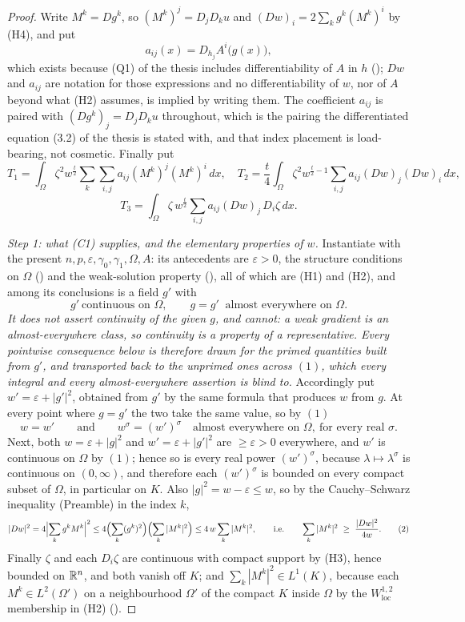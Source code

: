 \begin{proof}
Write $M^k=Dg^k$, so $(M^k)^j=D_jD_ku$ and $(Dw)_i=2\sum_kg^k(M^k)^i$ by (H4),
and put
\[
a_{ij}(x)=D_{h_j}A^i\bigl(g(x)\bigr),
\]
which exists because (Q1) of the thesis includes differentiability of $A$ in $h$
(); $Dw$ and $a_{ij}$ are notation for those
expressions and no differentiability of $w$, nor of $A$ beyond what (H2)
assumes, is implied by writing them.  The coefficient $a_{ij}$ is paired with
$(Dg^k)_j=D_jD_ku$ throughout, which is the pairing the differentiated equation
(3.2) of the thesis is stated with, and that index placement is load-bearing, not
cosmetic.  Finally put
\[
T_1=\int_\Omega\zeta^2w^{\frac t2}\sum_k\sum_{i,j}a_{ij}(M^k)^j(M^k)^i\,dx,
\quad
T_2=\frac t4\int_\Omega\zeta^2w^{\frac t2-1}\sum_{i,j}a_{ij}(Dw)_j(Dw)_i\,dx,
\]
\[
T_3=\int_\Omega\zeta\,w^{\frac t2}\sum_{i,j}a_{ij}(Dw)_j\,D_i\zeta\,dx .
\]

\emph{Step 1: what (C1) supplies, and the elementary properties of $w$.}
Instantiate  with the present
$n,p,\varepsilon,\gamma_0,\gamma_1,\Omega,A$: its antecedents are
$\varepsilon>0$, the structure conditions on $\Omega$
() and the weak-solution property
(), all of which are (H1) and (H2), and among its
conclusions is a field $g'$ with
\[
g'\ \text{continuous on }\Omega,
\qquad
g=g'\ \text{ almost everywhere on }\Omega .
\tag{1}
\]
\emph{It does not assert continuity of the given $g$, and cannot: a weak
gradient is an almost-everywhere class, so continuity is a property of a
representative.  Every \emph{pointwise} consequence below is therefore drawn for
the primed quantities built from $g'$, and transported back to the unprimed ones
across $(1)$, which every integral and every almost-everywhere assertion is
blind to.}  Accordingly put $w'=\varepsilon+|g'|^2$, obtained from $g'$ by the
same formula that produces $w$ from $g$.  At every point where $g=g'$ the two
take the same value, so by $(1)$
\[
w=w'\qquad\text{and}\qquad w^\sigma=(w')^\sigma
\quad\text{almost everywhere on }\Omega,\ \text{for every real }\sigma .
\tag{1$'$}
\]
Next, both $w=\varepsilon+|g|^2$ and $w'=\varepsilon+|g'|^2$ are
$\ge\varepsilon>0$ everywhere, and $w'$ is continuous on $\Omega$ by $(1)$;
hence so is every real power $(w')^\sigma$, because
$\lambda\mapsto\lambda^\sigma$ is continuous on $(0,\infty)$, and therefore each
$(w')^\sigma$ is bounded on every compact subset of $\Omega$, in particular on
$K$.  Also $|g|^2=w-\varepsilon\le w$, so by the Cauchy--Schwarz inequality
(Preamble) in the index $k$,
\[
|Dw|^2=4\Bigl|\sum_kg^kM^k\Bigr|^2
\le4\Bigl(\sum_k(g^k)^2\Bigr)\Bigl(\sum_k|M^k|^2\Bigr)
\le4\,w\sum_k|M^k|^2 ,
\qquad\text{i.e.}\qquad
\sum_k|M^k|^2\ \ge\ \frac{|Dw|^2}{4w} .
\tag{2}
\]
Finally $\zeta$ and each $D_i\zeta$ are continuous with compact support by (H3),
hence bounded on $\mathbb{R}^n$, and both vanish off $K$; and $\sum_k|M^k|^2\in L^1(K)$,
because each $M^k\in L^2(\Omega')$ on a neighbourhood $\Omega'$ of the compact
$K$ inside $\Omega$ by the $W^{1,2}_{\mathrm{loc}}$ membership in (H2)
().


\end{proof}
